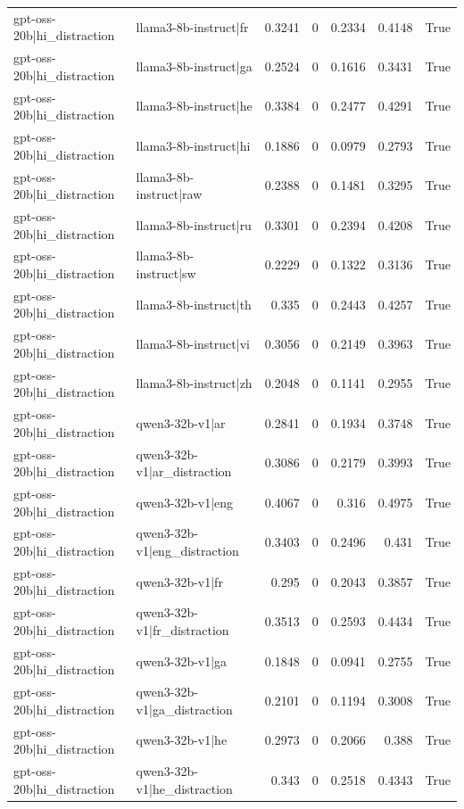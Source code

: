 \begin{table}
\begin{tabular}{l l r r r r l}
gpt-oss-20b|hi_distraction & llama3-8b-instruct|fr & 0.3241 & 0 & 0.2334 & 0.4148 & True \\
gpt-oss-20b|hi_distraction & llama3-8b-instruct|ga & 0.2524 & 0 & 0.1616 & 0.3431 & True \\
gpt-oss-20b|hi_distraction & llama3-8b-instruct|he & 0.3384 & 0 & 0.2477 & 0.4291 & True \\
gpt-oss-20b|hi_distraction & llama3-8b-instruct|hi & 0.1886 & 0 & 0.0979 & 0.2793 & True \\
gpt-oss-20b|hi_distraction & llama3-8b-instruct|raw & 0.2388 & 0 & 0.1481 & 0.3295 & True \\
gpt-oss-20b|hi_distraction & llama3-8b-instruct|ru & 0.3301 & 0 & 0.2394 & 0.4208 & True \\
gpt-oss-20b|hi_distraction & llama3-8b-instruct|sw & 0.2229 & 0 & 0.1322 & 0.3136 & True \\
gpt-oss-20b|hi_distraction & llama3-8b-instruct|th & 0.335 & 0 & 0.2443 & 0.4257 & True \\
gpt-oss-20b|hi_distraction & llama3-8b-instruct|vi & 0.3056 & 0 & 0.2149 & 0.3963 & True \\
gpt-oss-20b|hi_distraction & llama3-8b-instruct|zh & 0.2048 & 0 & 0.1141 & 0.2955 & True \\
gpt-oss-20b|hi_distraction & qwen3-32b-v1|ar & 0.2841 & 0 & 0.1934 & 0.3748 & True \\
gpt-oss-20b|hi_distraction & qwen3-32b-v1|ar_distraction & 0.3086 & 0 & 0.2179 & 0.3993 & True \\
gpt-oss-20b|hi_distraction & qwen3-32b-v1|eng & 0.4067 & 0 & 0.316 & 0.4975 & True \\
gpt-oss-20b|hi_distraction & qwen3-32b-v1|eng_distraction & 0.3403 & 0 & 0.2496 & 0.431 & True \\
gpt-oss-20b|hi_distraction & qwen3-32b-v1|fr & 0.295 & 0 & 0.2043 & 0.3857 & True \\
gpt-oss-20b|hi_distraction & qwen3-32b-v1|fr_distraction & 0.3513 & 0 & 0.2593 & 0.4434 & True \\
gpt-oss-20b|hi_distraction & qwen3-32b-v1|ga & 0.1848 & 0 & 0.0941 & 0.2755 & True \\
gpt-oss-20b|hi_distraction & qwen3-32b-v1|ga_distraction & 0.2101 & 0 & 0.1194 & 0.3008 & True \\
gpt-oss-20b|hi_distraction & qwen3-32b-v1|he & 0.2973 & 0 & 0.2066 & 0.388 & True \\
gpt-oss-20b|hi_distraction & qwen3-32b-v1|he_distraction & 0.343 & 0 & 0.2518 & 0.4343 & True \\

\end{tabular}
\end{table}

